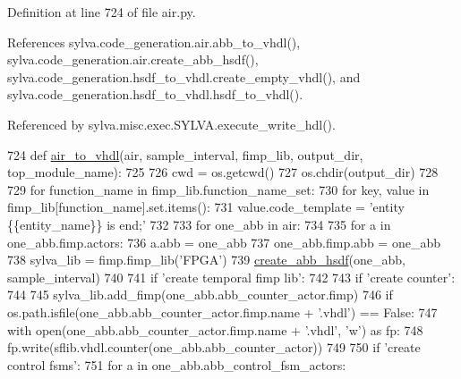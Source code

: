 Definition at line 724 of file air.\+py.



References sylva.\+code\+\_\+generation.\+air.\+abb\+\_\+to\+\_\+vhdl(), sylva.\+code\+\_\+generation.\+air.\+create\+\_\+abb\+\_\+hsdf(), sylva.\+code\+\_\+generation.\+hsdf\+\_\+to\+\_\+vhdl.\+create\+\_\+empty\+\_\+vhdl(), and sylva.\+code\+\_\+generation.\+hsdf\+\_\+to\+\_\+vhdl.\+hsdf\+\_\+to\+\_\+vhdl().



Referenced by sylva.\+misc.\+exec.\+S\+Y\+L\+V\+A.\+execute\+\_\+write\+\_\+hdl().


\begin{DoxyCode}
724 \textcolor{keyword}{def }\hyperlink{namespacesylva_1_1code__generation_1_1air_a12c49366c61395ad719575c8715849cc}{air\_to\_vhdl}(air, sample\_interval, fimp\_lib, output\_dir, top\_module\_name):
725 
726     cwd = os.getcwd()
727     os.chdir(output\_dir)
728 
729     \textcolor{keywordflow}{for} function\_name \textcolor{keywordflow}{in} fimp\_lib.function\_name\_set:
730         \textcolor{keywordflow}{for} key, value \textcolor{keywordflow}{in} fimp\_lib[function\_name].set.items():
731             value.code\_template = \textcolor{stringliteral}{'entity \{\{entity\_name\}\} is end;'}
732 
733     \textcolor{keywordflow}{for} one\_abb \textcolor{keywordflow}{in} air:
734 
735         \textcolor{keywordflow}{for} a \textcolor{keywordflow}{in} one\_abb.fimp.actors:
736             a.abb = one\_abb
737         one\_abb.fimp.abb = one\_abb
738         sylva\_lib = fimp.fimp\_lib(\textcolor{stringliteral}{'FPGA'})
739         \hyperlink{namespacesylva_1_1code__generation_1_1air_a5a2588aa1c35ad4bd47d3b8f7eeca94a}{create\_abb\_hsdf}(one\_abb, sample\_interval)
740 
741         \textcolor{keywordflow}{if} \textcolor{stringliteral}{'create temporal fimp lib'}:
742 
743             \textcolor{keywordflow}{if} \textcolor{stringliteral}{'create counter'}:
744 
745                 sylva\_lib.add\_fimp(one\_abb.abb\_counter\_actor.fimp)
746                 \textcolor{keywordflow}{if} os.path.isfile(one\_abb.abb\_counter\_actor.fimp.name + \textcolor{stringliteral}{'.vhdl'}) == \textcolor{keyword}{False}:
747                     with open(one\_abb.abb\_counter\_actor.fimp.name + \textcolor{stringliteral}{'.vhdl'}, \textcolor{stringliteral}{'w'}) \textcolor{keyword}{as} fp:
748                         fp.write(sflib.vhdl.counter(one\_abb.abb\_counter\_actor))
749 
750             \textcolor{keywordflow}{if} \textcolor{stringliteral}{'create control fsms'}:
751                 \textcolor{keywordflow}{for} a \textcolor{keywordflow}{in} one\_abb.abb\_control\_fsm\_actors:

\end{DoxyCode}
